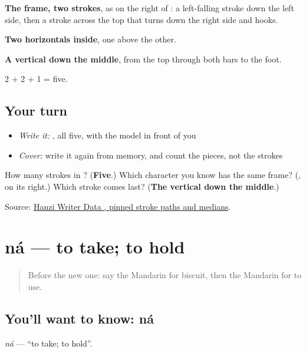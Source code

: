 \begin{quote}
\end{quote}

\textbf{The frame, two strokes}, as on the right of : a left-falling stroke down the left side, then a stroke across the top that turns down the right side and hooks.

\textbf{Two horizontals inside}, one above the other.

\textbf{A vertical down the middle}, from the top through both bars to the foot.

2 + 2 + 1 = five.

\subsection*{Your turn}
\begin{itemize}
\raggedright
  \item \emph{Write it:} , all five, with the model in front of you
  \item \emph{Cover:} write it again from memory, and count the pieces, not the strokes
\end{itemize}

\begin{tcolorbox}[breakable,colback=teal!4,colframe=teal!35!black,title={Before you move on}]
How many strokes in ? (\textbf{Five}.) Which character you know has the same frame? (\textbf{}, on its right.) Which stroke comes last? (\textbf{The vertical down the middle}.)

Source: \href{https://raw.githubusercontent.com/chanind/hanzi-writer-data/68d10a4b21150cae5e1ebbd223eed289cf32d90c/data/\%E7\%94\%A8.json}{Hanzi Writer Data , pinned stroke paths and medians}.
\end{tcolorbox}
\section[ná]{ná — to take; to hold}

\label{lesson:ZH-C103-na}



\begin{quote}
Before the new one: say the Mandarin for biscuit, then the Mandarin for to use.
\end{quote}

\subsection*{You'll want to know: ná}
\emph{ná} — \textquotedblleft{}to take; to hold\textquotedblright{}.

